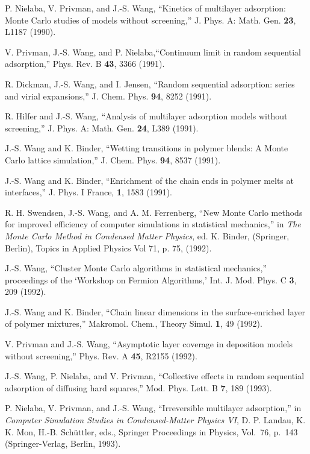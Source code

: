 \itm P. Nielaba, V. Privman, and J.-S. Wang, ``Kinetics of multilayer
  adsorption: Monte Carlo studies of models without screening,'' 
  J. Phys. A: Math. Gen. {\bf 23}, L1187 (1990).

\itm V. Privman, J.-S. Wang, and P. Nielaba,``Continuum limit in 
  random sequential adsorption,'' Phys. Rev. B {\bf 43}, 3366 (1991).

\itm R. Dickman, J.-S. Wang, and I. Jensen, ``Random sequential 
  adsorption: series and virial expansions,'' 
  J. Chem. Phys. {\bf 94}, 8252 (1991).

\itm R. Hilfer and J.-S. Wang, ``Analysis of multilayer
  adsorption models without screening,'' 
  J. Phys. A: Math. Gen. {\bf 24}, L389 (1991). 

\itm J.-S. Wang and K. Binder, ``Wetting transitions in 
  polymer blends: A Monte Carlo lattice simulation,'' 
  J. Chem. Phys. {\bf 94}, 8537 (1991).
 
\itm J.-S. Wang and K. Binder, ``Enrichment of the chain ends in polymer
  melts at interfaces,'' J. Phys. I France, {\bf 1}, 1583 (1991).

\itm R. H. Swendsen, J.-S. Wang, and A. M. Ferrenberg, ``New
  Monte Carlo methods for improved efficiency of computer
  simulations in statistical mechanics,'' in 
  {\it The Monte Carlo Method in Condensed Matter Physics}, 
  ed. K. Binder, (Springer, Berlin), 
  Topics in Applied Physics Vol 71, p. 75, (1992). 

\itm J.-S. Wang, ``Cluster Monte Carlo algorithms
  in statistical mechanics,'' proceedings of the `Workshop on Fermion
  Algorithms,' Int. J. Mod. Phys. C {\bf 3}, 209 (1992).

\itm J.-S. Wang and K. Binder, ``Chain linear dimensions 
  in the surface-enriched layer of polymer mixtures,'' 
  Makromol. Chem., Theory Simul. {\bf 1}, 49 (1992).

\itm V. Privman and J.-S. Wang, ``Asymptotic layer coverage in 
  deposition models without screening,'' Phys. Rev. A {\bf 45}, R2155 (1992).

\itm J.-S. Wang, P. Nielaba, and V. Privman, ``Collective effects
  in random sequential adsorption of diffusing hard squares,'' 
  Mod. Phys. Lett. B {\bf 7}, 189 (1993).

\itm P. Nielaba, V. Privman, and J.-S. Wang, ``Irreversible
  multilayer adsorption,'' in {\it Computer Simulation Studies in 
  Condensed-Matter Physics VI}, D. P. Landau,
  K. K. Mon, H.-B. Sch\"uttler, eds., Springer Proceedings
  in Physics, Vol.~76, p.~143 (Springer-Verlag, Berlin, 1993).

